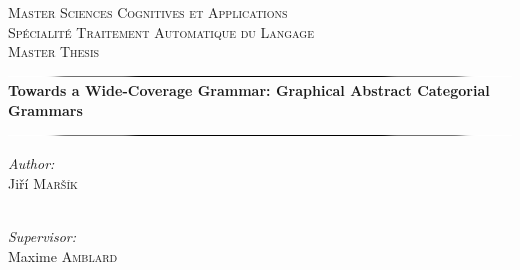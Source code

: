 

\begin{titlepage}
\begin{center}

\newcommand{\HRule}{\includegraphics[width=\textwidth]{images/hrule.png}}


\textsc{\LARGE Master Sciences Cognitives et Applications\\Sp\'ecialit\'e Traitement Automatique du Langage}\\[1.5cm]

\textsc{\Large Master Thesis}\\[0.65cm]

\HRule \\[0.6cm]
{ \huge \bfseries Towards a Wide-Coverage Grammar: Graphical Abstract Categorial Grammars }\\[0.4cm]

\HRule \\[1.75cm]

\begin{minipage}{0.4\textwidth}
\begin{flushleft} \large
\emph{Author:}\\
Ji\v{r}\'{i} \textsc{Mar\v{s}\'{i}k}\\
~
\end{flushleft}
\end{minipage}
\begin{minipage}{0.4\textwidth}
\begin{flushright} \large
\emph{Supervisor:} \\
Maxime \textsc{Amblard} \\
~
\end{flushright}
\end{minipage}
~\\[2.1cm]

\end{center}
\end{titlepage}


\newpage
~~ 
\newpage
{}
\setcounter{page}{3}
